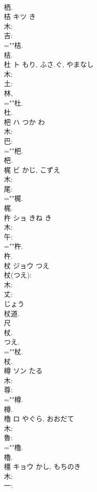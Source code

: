 \documentclass[8pt]{extreport}
\begin{document}
\begin{CJK}{UTF8}{min}
\\	栖.
\\	桔	キツ		き	
\\	木: 
\\	吉: 
\\	=""桔.
\\	桔.
\\	杜	ト	もり, ふさ.ぐ, やまなし		
\\	木: 
\\	土: 
\\	林, 
\\	=""杜.
\\	杜.
\\	杷	ハ	つか	わ	
\\	木: 
\\	巴: 
\\	=""杷.
\\	杷.
\\	梶	ビ	かじ, こずえ		
\\	木: 
\\	尾: 
\\	=""梶.
\\	梶.
\\	杵	ショ	きね	き	
\\	木: 
\\	午: 
\\	=""杵.
\\	杵.
\\	杖	ジョウ	つえ		
\\	杖(つえ): 
\\	木: 
\\	丈: 
\\	じょう 
\\	杖道. 
\\	尺 
\\	杖. 
\\	つえ.
\\	=""杖.
\\	杖.
\\	樽	ソン	たる		
\\	木: 
\\	尊: 
\\	=""樽.
\\	樽.
\\	櫓	ロ	やぐら, おおだて		
\\	木: 
\\	魯: 
\\	=""櫓.
\\	櫓.
\\	橿	キョウ	かし, もちのき		
\\	木: 
\\	一: 

\end{CJK}
\end{document}

